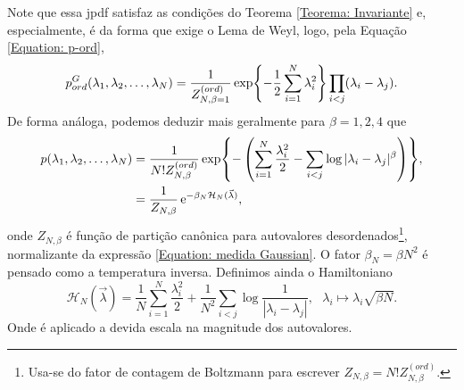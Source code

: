 Note que essa jpdf satisfaz as condições do Teorema \ref{Teorema: Invariante} e, especialmente, é da forma que exige o Lema de Weyl, logo, pela Equação \ref{Equation: p-ord}, $$ p_{ord}^{G}(\lambda_1, \lambda_2, \dots, \lambda_N) = \frac{1}{Z_{N, \beta = 1}^{(ord)}} \exp{-\frac{1}{2} \sum_{i = 1}^{N} \lambda_i^2} \prod_{i < j} (\lambda_i - \lambda_j).$$ 
De forma análoga, podemos deduzir mais geralmente para $\beta = 1,2,4$ que
\begin{equation}
	\begin{split}
		p(\lambda_1, \lambda_2, \dots, \lambda_N) 
		&= \frac{1}{ N! Z_{N, \beta}^{(ord)}} \exp{- \left(\sum_{i = 1}^{N} \frac{\lambda_i^2}{2} - \sum_{i < j} \log{|\lambda_i - \lambda_j|^{\beta}} \right)}, \\
		&= \frac{1}{Z_{N, \beta}} \operatorname{e}^{-\beta_N \mathcal{H}_N(\vec{\lambda})},
	\end{split}
\label{Equation: medida Gaussian}
\end{equation}
onde $Z_{N, \beta}$ é função de partição canônica para autovalores desordenados\footnote{Usa-se do fator de contagem de Boltzmann para escrever $ Z_{N, \beta} = N! Z_{N, \beta}^{(ord)}$.}, normalizante da expressão \ref{Equation: medida Gaussian}. O fator $\beta_N = \beta N^2$ é pensado como a temperatura inversa. Definimos ainda o Hamiltoniano $$\mathcal{H}_N(\vec{\lambda}) = \frac{1}{N}\sum_{i = 1}^{N} \frac{\lambda_i^2}{2} + \frac{1}{N^2} \sum_{i < j} \log{\frac{1}{|\lambda_i - \lambda_j|}}, \ \ \  \lambda_i \mapsto \lambda_i \sqrt{\beta N}.$$ Onde é aplicado a devida escala na magnitude dos autovalores.

